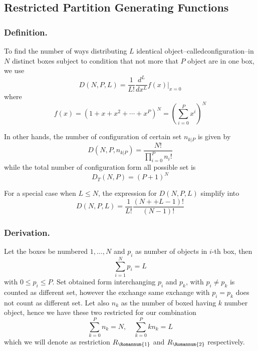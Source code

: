 \documentclass[../../main.tex]{subfiles}
\begin{document}
\subsection*{Restricted Partition Generating Functions}
\subsubsection*{Definition.} To find the number of ways distributing $L$ identical object--calledconfiguration--in $N$ distinct boxes subject to condition that not more that $P$ object are in one box, we use 
\begin{equation*}
    D(N,P,L)=\frac{1}{L!}\frac{d^L}{dx^L}f(x)\bigg|_{x=0}
\end{equation*}
where
\begin{equation*}
    f(x)=\left(1+x+x^2+\cdots+ x^P\right)^N=\left(\sum^{P }_{i=0}x^i\right)^N
\end{equation*}

In other hands, the number of configuration of certain set $n_{k|P}$ is given by 
\begin{equation*}
    D(N,P,n_{k|P})=\frac{N!}{\displaystyle\prod_{i=0}^{P}n_i!}
\end{equation*}
while the total number of configuration form all possible set is 
\begin{equation*}
    D_T(N,P)=(P+1)^N
\end{equation*}

For a special case when $L\leq N$, the expression for $D(N,P,L)$ simplify into 
\begin{equation*}
    D(N,P,L)=\frac{1}{L!}\frac{(N++L-1)!}{(N-1)!}
\end{equation*}

\subsubsection*{Derivation.} Let the boxes be numbered $1,\dots, N$ and $p_i$ as number of objects in $i$-th box, then 
\begin{equation*}
    \sum_{i=1}^{N}p_i=L
\end{equation*}
with $0\leq p_i\leq P$. Set obtained form interchanging $p_i$ and $p_k$, with $p_i\neq p_k$ is counted as different set, however the exchange same exchange with $p_i=p_k$ does not count as different set. Let also $n_k$ as the number of boxed having $k$ number object, hence we have these two restricted for our combination
\begin{equation*}
    \sum_{k=0}^{P}n_k=N,\quad\sum_{k=0 }^{P }kn_k=L
\end{equation*}
which we will denote as restriction $R_\Romannum{1}$ and $R_\Romannum{2}$ respectively.
\end{document}
